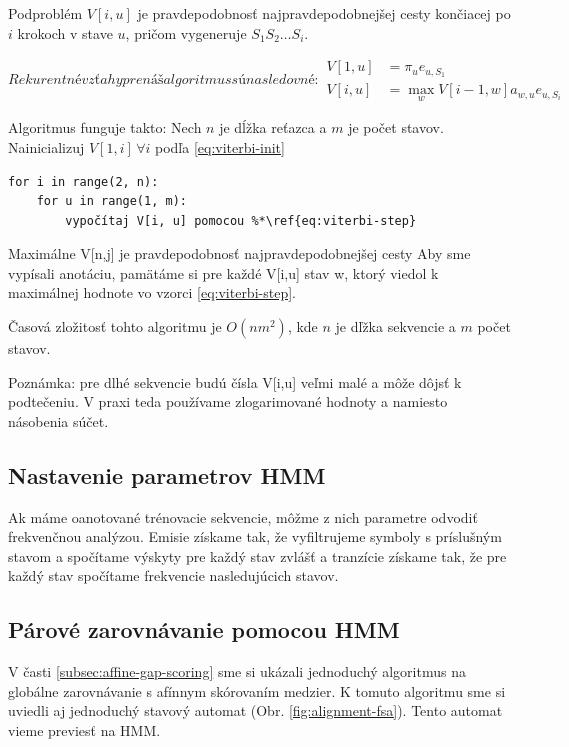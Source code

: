 Podproblém $V[i,u]$ je pravdepodobnosť najpravdepodobnejšej cesty končiacej po $i$ krokoch v stave $u$, pričom vygeneruje $S_1 S_2 \dots S_i$.

\begin{subequations}
Rekurentné vzťahy pre náš algoritmus sú nasledovné:
\begin{align}
        \label{eq:viterbi-init}
        V[1,u] &= \pi_u e_{u,S_1}\\
        \label{eq:viterbi-step}
        V[i,u] &= \max_w V[i-1, w] a_{w,u} e_{u,S_i}
\end{align}
\end{subequations}

Algoritmus funguje takto:
Nech $n$ je dĺžka reťazca a $m$ je počet stavov.
Nainicializuj $V[1,i]\, \forall i$ podľa \ref{eq:viterbi-init}

\begin{lstlisting}
for i in range(2, n):
    for u in range(1, m):
        vypočítaj V[i, u] pomocou %*\ref{eq:viterbi-step}
\end{lstlisting}
Maximálne V[n,j] je pravdepodobnosť najpravdepodobnejšej cesty
Aby sme vypísali anotáciu, pamätáme si pre každé V[i,u] stav w, ktorý viedol k maximálnej hodnote vo vzorci \ref{eq:viterbi-step}.

Časová zložitosť tohto algoritmu je $O(nm^2)$, kde $n$ je dľžka sekvencie a $m$ počet stavov.

Poznámka: pre dlhé sekvencie budú čísla V[i,u] veľmi malé a môže dôjsť k podtečeniu. V praxi teda používame zlogarimované hodnoty a namiesto násobenia súčet.

\subsection{Nastavenie parametrov HMM}
Ak máme oanotované trénovacie sekvencie, môžme z nich parametre odvodiť frekvenčnou analýzou. Emisie získame tak, že vyfiltrujeme symboly s príslušným stavom a spočítame výskyty pre každý stav zvlášť a tranzície získame tak, že pre každý stav spočítame frekvencie nasledujúcich stavov.

\subsection{Párové zarovnávanie pomocou HMM}
V časti \ref{subsec:affine-gap-scoring} sme si ukázali jednoduchý algoritmus na globálne zarovnávanie s afínnym skórovaním medzier. K tomuto algoritmu sme si uviedli aj jednoduchý stavový automat (Obr. \ref{fig:alignment-fsa}). Tento automat vieme previesť na HMM.

